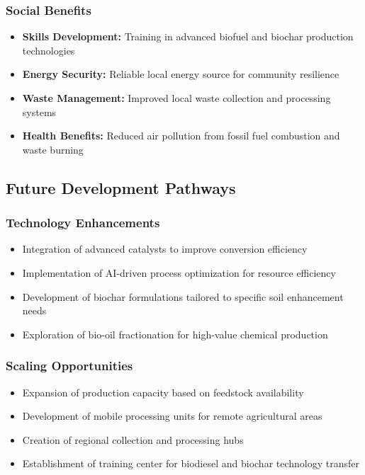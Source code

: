 \subsubsection{Social Benefits}
\begin{itemize}
    \item \textbf{Skills Development:} Training in advanced biofuel and biochar production technologies
    \item \textbf{Energy Security:} Reliable local energy source for community resilience
    \item \textbf{Waste Management:} Improved local waste collection and processing systems
    \item \textbf{Health Benefits:} Reduced air pollution from fossil fuel combustion and waste burning
\end{itemize}

\subsection{Future Development Pathways}

\subsubsection{Technology Enhancements}
\begin{itemize}
    \item Integration of advanced catalysts to improve conversion efficiency
    \item Implementation of AI-driven process optimization for resource efficiency
    \item Development of biochar formulations tailored to specific soil enhancement needs
    \item Exploration of bio-oil fractionation for high-value chemical production
\end{itemize}

\subsubsection{Scaling Opportunities}
\begin{itemize}
    \item Expansion of production capacity based on feedstock availability
    \item Development of mobile processing units for remote agricultural areas
    \item Creation of regional collection and processing hubs
    \item Establishment of training center for biodiesel and biochar technology transfer
\end{itemize}

